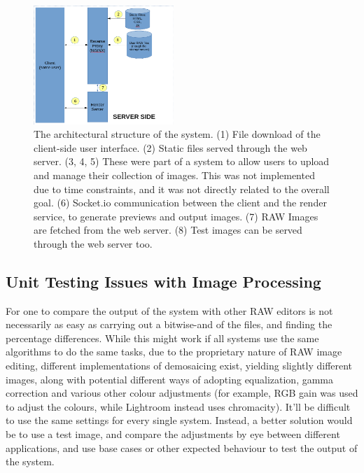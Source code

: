\documentclass[10pt,a4paper]{article}
\begin{document}

\begin{figure}
\centering
\includegraphics[width=200px]{architecture}
\caption{The architectural structure of the system. (1) File download of the client-side user interface. (2) Static files served through the web server.
(3, 4, 5) These were part of a system to allow users to upload and manage their collection of images. This was not implemented due to time constraints, and it was not directly related to the overall goal. (6) Socket.io communication
between the client and the render service, to generate previews and output images. (7) RAW Images are fetched from the web server.  (8) Test images can be served through the web server too.}
\end{figure}
\subsection{Unit Testing Issues with Image Processing}

For one to compare the output of the system with other RAW editors is not necessarily as easy as carrying out a bitwise-and  of the files, and finding the percentage
differences. While this might work if all systems use the same algorithms to do the same tasks, due to the proprietary nature of RAW image editing,
different implementations of demosaicing exist, yielding slightly different images, along with potential different ways of adopting equalization,
gamma correction and various other colour adjustments (for example, RGB gain was used to adjust the colours, while Lightroom instead uses chromacity).
It'll be difficult to use the same settings for every single system. Instead, a better solution would be to use a test image, and compare the adjustments
by eye between different applications, and use base cases or other expected behaviour to test the output of the system.
\end{document}
